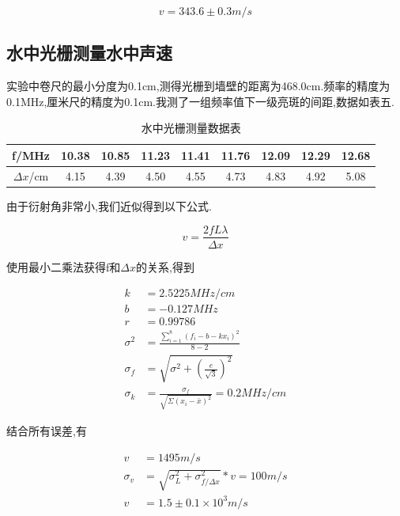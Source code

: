 \documentclass[a4paper,10pt,notitlepage]{article}
\begin{document}
\begin{equation}
	v = 343.6 \pm 0.3 m/s
\end{equation}

\subsection{水中光栅测量水中声速}
	
	实验中卷尺的最小分度为0.1cm,测得光栅到墙壁的距离为468.0cm.频率的精度为0.1MHz,厘米尺的精度为0.1cm.我测了一组频率值下一级亮斑的间距,数据如表五.
	
\begin{table}[htbp]
\centering

	\begin{tabular}{|c|c|c|c|c|c|c|c|c|}
	\hline
	f/MHz & 10.38 & 10.85 & 11.23 & 11.41 & 11.76 & 12.09 & 12.29 & 12.68 \\
	\hline
	$\Delta x$/cm & 4.15 & 4.39 & 4.50 & 4.55 & 4.73 & 4.83 & 4.92 & 5.08 \\
	\hline
	\end{tabular}
	\caption{水中光栅测量数据表}

\end{table}

	由于衍射角非常小,我们近似得到以下公式.
	
\begin{equation}
	v = \frac{2fL\lambda}{\Delta x}
\end{equation}

	使用最小二乘法获得f和$\Delta x$的关系,得到
	
\begin{align}
	k &= 2.5225 MHz/cm \\
	b &= -0.127MHz \\
	r &= 0.99786 \\
	\sigma ^ 2 &= \frac{\sum_{i = 1}^{8}(f_i - b - kx_i )^2}{8 - 2} \\
	\sigma_f &= \sqrt{\sigma^2 + (\frac{e}{\sqrt{3}})^2} \\
	\sigma_{k} &= \frac{\sigma_f}{\sqrt{\Sigma(x_i - \bar{x})^2}} = 0.2 MHz/cm
\end{align}

	结合所有误差,有
	
\begin{align}
	v &= 1495 m/s \\
	\sigma_v &= \sqrt{\sigma_L ^ 2 + \sigma_{f/\Delta x} ^ 2} * v = 100 m/s \\
	v &= 1.5 \pm 0.1 \times 10^3 m/s
\end{align}
\end{document}
